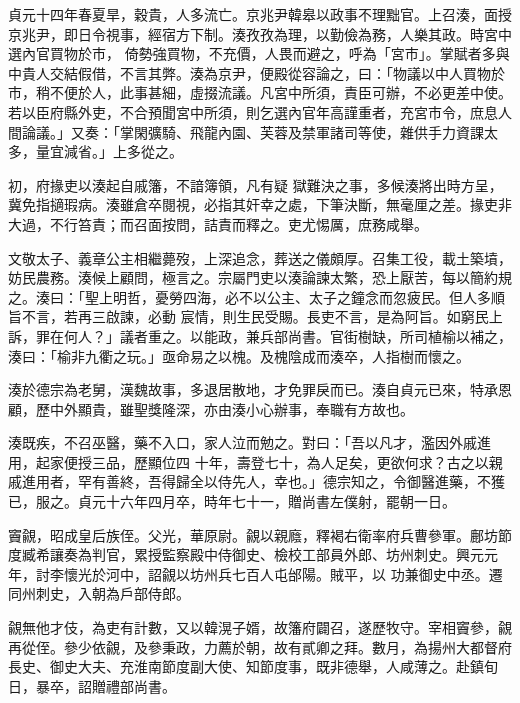 \begin{pinyinscope}
 貞元十四年春夏旱，穀貴，人多流亡。京兆尹韓皋以政事不理黜官。上召湊，面授京兆尹，即日令視事，經宿方下制。湊孜孜為理，以勤儉為務，人樂其政。時宮中選內官買物於市，
 倚勢強買物，不充價，人畏而避之，呼為「宮市」。掌賦者多與中貴人交結假借，不言其弊。湊為京尹，便殿從容論之，曰：「物議以中人買物於市，稍不便於人，此事甚細，虛掇流議。凡宮中所須，責臣可辦，不必更差中使。若以臣府縣外吏，不合預聞宮中所須，則乞選內官年高謹重者，充宮市令，庶息人間論議。」又奏：「掌閑彍騎、飛龍內園、芙蓉及禁軍諸司等使，雜供手力資課太多，量宜減省。」上多從之。



 初，府掾吏以湊起自戚籓，不諳簿領，凡有疑
 獄難決之事，多候湊將出時方呈，冀免指擿瑕病。湊雖倉卒閱視，必指其奸幸之處，下筆決斷，無毫厘之差。掾吏非大過，不行笞責；而召面按問，詰責而釋之。吏尤惕厲，庶務咸舉。



 文敬太子、義章公主相繼薨歿，上深追念，葬送之儀頗厚。召集工役，載土築墳，妨民農務。湊候上顧問，極言之。宗屬門吏以湊論諫太繁，恐上厭苦，每以簡約規之。湊曰：「聖上明哲，憂勞四海，必不以公主、太子之鐘念而忽疲民。但人多順旨不言，若再三啟諫，必動
 宸情，則生民受賜。長吏不言，是為阿旨。如窮民上訴，罪在何人？」議者重之。以能政，兼兵部尚書。官街樹缺，所司植榆以補之，湊曰：「榆非九衢之玩。」亟命易之以槐。及槐陰成而湊卒，人指樹而懷之。



 湊於德宗為老舅，漢魏故事，多退居散地，才免罪戾而已。湊自貞元已來，特承恩顧，歷中外顯貴，雖聖獎隆深，亦由湊小心辦事，奉職有方故也。



 湊既疾，不召巫醫，藥不入口，家人泣而勉之。對曰：「吾以凡才，濫因外戚進用，起家便授三品，歷顯位四
 十年，壽登七十，為人足矣，更欲何求？古之以親戚進用者，罕有善終，吾得歸全以侍先人，幸也。」德宗知之，令御醫進藥，不獲已，服之。貞元十六年四月卒，時年七十一，贈尚書左僕射，罷朝一日。



 竇覦，昭成皇后族侄。父光，華原尉。覦以親廕，釋褐右衛率府兵曹參軍。鄜坊節度臧希讓奏為判官，累授監察殿中侍御史、檢校工部員外郎、坊州刺史。興元元年，討李懷光於河中，詔覦以坊州兵七百人屯邰陽。賊平，以
 功兼御史中丞。遷同州刺史，入朝為戶部侍郎。



 覦無他才伎，為吏有計數，又以韓滉子婿，故籓府闢召，遂歷牧守。宰相竇參，覦再從侄。參少依覦，及參秉政，力薦於朝，故有貳卿之拜。數月，為揚州大都督府長史、御史大夫、充淮南節度副大使、知節度事，既非德舉，人咸薄之。赴鎮旬日，暴卒，詔贈禮部尚書。




\end{pinyinscope}

